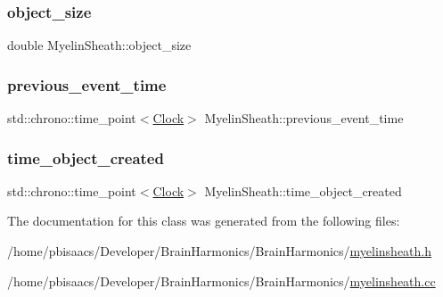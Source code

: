 \subsubsection{\texorpdfstring{object\+\_\+size}{object\_size}}
{\footnotesize\ttfamily double Myelin\+Sheath\+::object\+\_\+size\hspace{0.3cm}{\ttfamily [private]}}

\mbox{\label{classMyelinSheath_a93336530fb4a6210f7bd3ec297192042}} 
\subsubsection{\texorpdfstring{previous\+\_\+event\+\_\+time}{previous\_event\_time}}
{\footnotesize\ttfamily std\+::chrono\+::time\+\_\+point$<$\mbox{\hyperlink{universe_8h_a0ef8d951d1ca5ab3cfaf7ab4c7a6fd80}{Clock}}$>$ Myelin\+Sheath\+::previous\+\_\+event\+\_\+time\hspace{0.3cm}{\ttfamily [private]}}

\mbox{\label{classMyelinSheath_a5ff52b5d66d81809d62851ce6b8b12a8}} 
\subsubsection{\texorpdfstring{time\+\_\+object\+\_\+created}{time\_object\_created}}
{\footnotesize\ttfamily std\+::chrono\+::time\+\_\+point$<$\mbox{\hyperlink{universe_8h_a0ef8d951d1ca5ab3cfaf7ab4c7a6fd80}{Clock}}$>$ Myelin\+Sheath\+::time\+\_\+object\+\_\+created\hspace{0.3cm}{\ttfamily [private]}}



The documentation for this class was generated from the following files\+:\begin{DoxyCompactItemize}
\item 
/home/pbisaacs/\+Developer/\+Brain\+Harmonics/\+Brain\+Harmonics/\mbox{\hyperlink{myelinsheath_8h}{myelinsheath.\+h}}\item 
/home/pbisaacs/\+Developer/\+Brain\+Harmonics/\+Brain\+Harmonics/\mbox{\hyperlink{myelinsheath_8cc}{myelinsheath.\+cc}}\end{DoxyCompactItemize}
